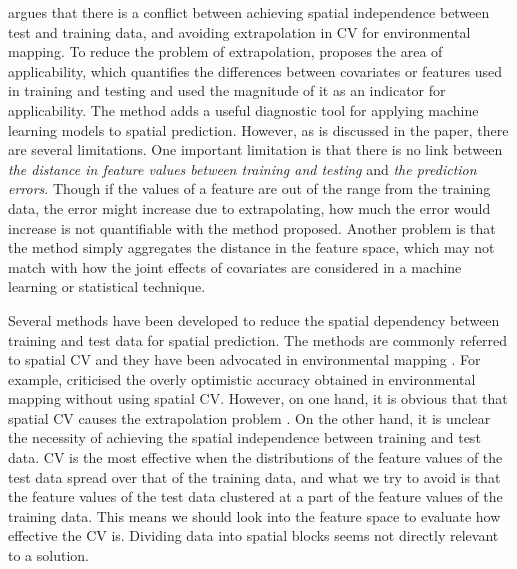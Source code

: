\documentclass{article}
\begin{document}

\cite{wadoux2021spatial} argues that there is a conflict between achieving spatial independence between test and training data, and avoiding extrapolation in CV for environmental mapping. To reduce the problem of extrapolation, \citep{meyer2021predicting} proposes the area of applicability, which quantifies the differences between covariates or features used in training and testing and used the magnitude of it as an indicator for applicability. The method adds a useful diagnostic tool for applying machine learning models to spatial prediction. However, as is discussed in the paper, there are several limitations. One important limitation is that there is no link between \textit{the distance in feature values between training and testing} and \textit{the prediction errors}. Though if the values of a feature are out of the range from the training data, the error might increase due to extrapolating, how much the error would increase is not quantifiable with the method proposed. Another problem is that the method simply aggregates the distance in the feature space, which may not match with how the joint effects of covariates are considered in a machine learning or statistical technique. 

Several methods have been developed to reduce the spatial dependency between training and test data for spatial prediction. The methods are commonly referred to spatial CV \citep{brenning2012spatial,meyer2018improving} and they have been advocated in environmental mapping \citep{ploton2020spatial}. For example, \cite{ploton2020spatial} criticised the overly optimistic accuracy obtained in environmental mapping without using spatial CV. However, on one hand, it is obvious that that spatial CV causes the extrapolation problem \citep{wadoux2021spatial}. %
On the other hand, it is unclear the necessity of achieving the spatial independence between training and test data. CV is the most effective when the distributions of the feature values of the test data spread over that of the training data, and what we try to avoid is that the feature values of the test data clustered at a part of the feature values of the training data. This means we should look into the feature space to evaluate how effective the CV is. Dividing data into spatial blocks seems not directly relevant to a solution. 
\end{document}
